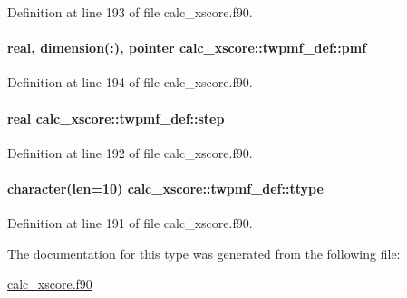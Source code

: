 Definition at line 193 of file calc\-\_\-xscore.\-f90.

\hypertarget{structcalc__xscore_1_1twpmf__def_a1f27cbd9f8d32604777089b06563a443}{
\paragraph[{pmf}]{\setlength{\rightskip}{0pt plus 5cm}real, dimension(\-:), pointer calc\-\_\-xscore\-::twpmf\-\_\-def\-::pmf}}\label{structcalc__xscore_1_1twpmf__def_a1f27cbd9f8d32604777089b06563a443}


Definition at line 194 of file calc\-\_\-xscore.\-f90.

\hypertarget{structcalc__xscore_1_1twpmf__def_ad1ae31ed8e6abb44c619bb499552b3af}{
\paragraph[{step}]{\setlength{\rightskip}{0pt plus 5cm}real calc\-\_\-xscore\-::twpmf\-\_\-def\-::step}}\label{structcalc__xscore_1_1twpmf__def_ad1ae31ed8e6abb44c619bb499552b3af}


Definition at line 192 of file calc\-\_\-xscore.\-f90.

\hypertarget{structcalc__xscore_1_1twpmf__def_a0fda2c297db50fad272ca607d7bbac99}{
\paragraph[{ttype}]{\setlength{\rightskip}{0pt plus 5cm}character(len=10) calc\-\_\-xscore\-::twpmf\-\_\-def\-::ttype}}\label{structcalc__xscore_1_1twpmf__def_a0fda2c297db50fad272ca607d7bbac99}


Definition at line 191 of file calc\-\_\-xscore.\-f90.



The documentation for this type was generated from the following file\-:\begin{DoxyCompactItemize}
\item 
\hyperlink{calc__xscore_8f90}{calc\-\_\-xscore.\-f90}\end{DoxyCompactItemize}
